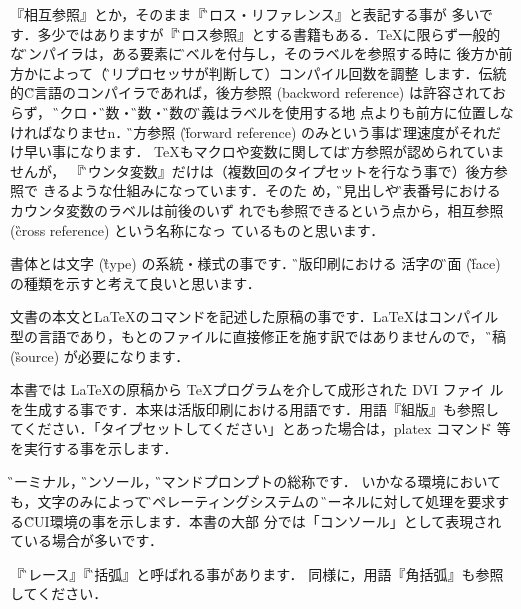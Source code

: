 \begin{description}
『相互参照』とか，そのまま『\G{クロス・リファレンス}』と表記する事が
多いです．多少ではありますが『\G{クロス参照}』とする書籍もある．\TeX に限らず一般的
な\G{コンパイラ}は，ある要素に\G{ラベル}を付与し，そのラベルを参照する時に
後方か前方かによって（\G{プリプロセッサ}が判断して）コンパイル回数を調整
します．伝統的\G{C言語}のコンパイラであれば，後方参照 (backword
 reference) は許容されておらず，
 \G{マクロ}・\G{定数}・\G{変数}・\G{関数}の\G{定義}はラベルを使用する地
 点よりも前方に位置しなければなりませn．\G{前方参照} (\G{forward reference})
 のみという事は\G{処理速度}がそれだけ早い事になります．
\TeX もマクロや変数に関しては\G{後方参照}が認められていませんが，
『\G{カウンタ変数}』だけは（複数回のタイプセットを行なう事で）後方参照で
 きるような仕組みになっています．そのた
 め，\G{節見出し}や\G{図表番号}におけるカウンタ変数のラベルは前後のいず
 れでも参照できるという点から，相互参照 (\G{cross reference}) という名称になっ
 ているものと思います．

書体とは文字 (\G{type}) の系統・様式の事です．\G{活版印刷}における
活字の\G{字面} (\G{face}) の種類を示すと考えて良いと思います．

文書の本文と\LaTeX のコマンドを記述した原稿の事です．\LaTeX はコンパイル
型の言語であり，もとのファイルに直接修正を施す訳ではありませんので，
\G{原稿} (\G{source}) が必要になります．

\end{description}
\begin{description}
本書では \LaTeX の原稿から \TeX プログラムを介して成形された DVI ファイ
ルを生成する事です．本来は活版印刷における用語です．用語『組版』も参照し
てください．「タイプセットしてください」とあった場合は，platex コマンド
等を実行する事を示します．

\G{ターミナル}，\G{コンソール}，\G{コマンドプロンプト}の総称です．
いかなる環境においても，文字のみによって\G{オペレーティングシステム}の
\G{カーネル}に対して処理を要求する\G{CUI}環境の事を示します．本書の大部
分では「コンソール」として表現されている場合が多いです．

\end{description}
\begin{description}
『\G{ブレース}』『\G{中括弧}』と呼ばれる事があります．
同様に，用語『角括弧』も参照してください．

\end{description}
